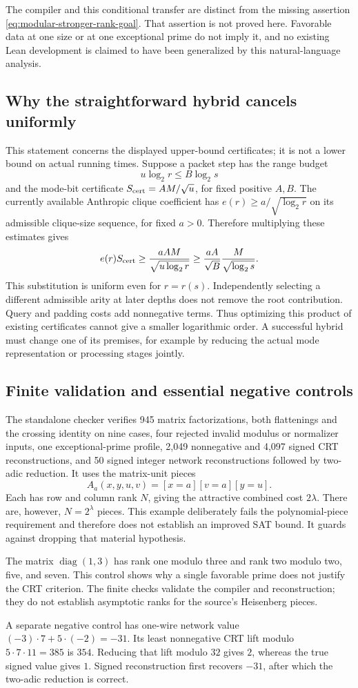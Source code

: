 The compiler and this conditional transfer are distinct from the
missing assertion \eqref{eq:modular-stronger-rank-goal}. That assertion
is not proved here. Favorable data at one size or at one exceptional
prime do not imply it, and no existing Lean development is claimed
to have been generalized by this natural-language analysis.

\subsection{Why the straightforward hybrid cancels uniformly}

This statement concerns the displayed upper-bound certificates;
it is not a lower bound on actual running times. Suppose a packet
step has the range budget
\[
 u\log_2r\le B\log_2s
\]
and the mode-bit certificate $S_{\rm cert}=AM/\sqrt u$, for fixed
positive $A,B$. The currently available Anthropic clique coefficient
has $e(r)\ge a/\sqrt{\log_2r}$ on its admissible clique-size sequence,
for fixed $a>0$. Therefore multiplying these estimates gives
\[
 e(r)S_{\rm cert}
 \ge \frac{aAM}{\sqrt{u\log_2r}}
 \ge \frac{aA}{\sqrt B}\frac{M}{\sqrt{\log_2s}}.
\]
This substitution is uniform even for $r=r(s)$. Independently
selecting a different admissible arity at later depths does not
remove the root contribution. Query and padding costs add
nonnegative terms. Thus optimizing this product of existing
certificates cannot give a smaller logarithmic order. A successful
hybrid must change one of its premises, for example by reducing the
actual mode representation or processing stages jointly.

\subsection{Finite validation and essential negative controls}

The standalone checker verifies 945 matrix factorizations, both
flattenings and the crossing identity on nine cases, four rejected
invalid modulus or normalizer inputs, one exceptional-prime profile,
2,049 nonnegative and 4,097 signed CRT reconstructions, and 50 signed
integer network reconstructions followed by two-adic reduction.
It uses the matrix-unit pieces
\[
 A_a(x,y,u,v)=[x=a][v=a][y=u].
\]
Each has row and column rank $N$, giving the attractive combined
cost $2\lambda$. There are, however, $N=2^\lambda$ pieces. This
example deliberately fails the polynomial-piece requirement and
therefore does not establish an improved SAT bound. It guards
against dropping that material hypothesis.

The matrix $\operatorname{diag}(1,3)$ has rank one modulo three
and rank two modulo two, five, and seven. This control shows why
a single favorable prime does not justify the CRT criterion.
The finite checks validate the compiler and reconstruction; they
do not establish asymptotic ranks for the source's Heisenberg pieces.

A separate negative control has one-wire network value
$(-3)\cdot7+5\cdot(-2)=-31$. Its least nonnegative CRT lift modulo
$5\cdot7\cdot11=385$ is $354$. Reducing that lift modulo $32$ gives
$2$, whereas the true signed value gives $1$. Signed reconstruction
first recovers $-31$, after which the two-adic reduction is correct.
